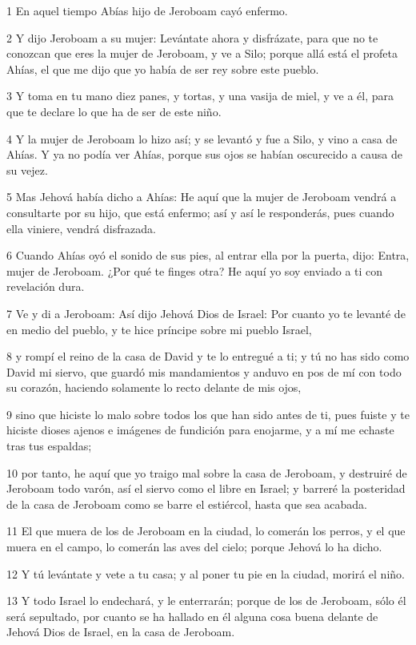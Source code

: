 \par 1 En aquel tiempo Abías hijo de Jeroboam cayó enfermo.
\par 2 Y dijo Jeroboam a su mujer: Levántate ahora y disfrázate, para que no te conozcan que eres la mujer de Jeroboam, y ve a Silo; porque allá está el profeta Ahías, el que me dijo que yo había de ser rey sobre este pueblo.
\par 3 Y toma en tu mano diez panes, y tortas, y una vasija de miel, y ve a él, para que te declare lo que ha de ser de este niño.
\par 4 Y la mujer de Jeroboam lo hizo así; y se levantó y fue a Silo, y vino a casa de Ahías. Y ya no podía ver Ahías, porque sus ojos se habían oscurecido a causa de su vejez.
\par 5 Mas Jehová había dicho a Ahías: He aquí que la mujer de Jeroboam vendrá a consultarte por su hijo, que está enfermo; así y así le responderás, pues cuando ella viniere, vendrá disfrazada.
\par 6 Cuando Ahías oyó el sonido de sus pies, al entrar ella por la puerta, dijo: Entra, mujer de Jeroboam. ¿Por qué te finges otra? He aquí yo soy enviado a ti con revelación dura.
\par 7 Ve y di a Jeroboam: Así dijo Jehová Dios de Israel: Por cuanto yo te levanté de en medio del pueblo, y te hice príncipe sobre mi pueblo Israel,
\par 8 y rompí el reino de la casa de David y te lo entregué a ti; y tú no has sido como David mi siervo, que guardó mis mandamientos y anduvo en pos de mí con todo su corazón, haciendo solamente lo recto delante de mis ojos,
\par 9 sino que hiciste lo malo sobre todos los que han sido antes de ti, pues fuiste y te hiciste dioses ajenos e imágenes de fundición para enojarme, y a mí me echaste tras tus espaldas;
\par 10 por tanto, he aquí que yo traigo mal sobre la casa de Jeroboam, y destruiré de Jeroboam todo varón, así el siervo como el libre en Israel; y barreré la posteridad de la casa de Jeroboam como se barre el estiércol, hasta que sea acabada. 
\par 11 El que muera de los de Jeroboam en la ciudad, lo comerán los perros, y el que muera en el campo, lo comerán las aves del cielo; porque Jehová lo ha dicho.
\par 12 Y tú levántate y vete a tu casa; y al poner tu pie en la ciudad, morirá el niño.
\par 13 Y todo Israel lo endechará, y le enterrarán; porque de los de Jeroboam, sólo él será sepultado, por cuanto se ha hallado en él alguna cosa buena delante de Jehová Dios de Israel, en la casa de Jeroboam.
